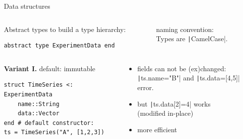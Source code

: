 \documentclass[aspectratio=169, 12pt]{beamer}
\begin{document}
    \begin{frame}[fragile]{Data structures}
        \vspace{-.25\baselineskip}
        \begin{columns}[T]
            \begin{column}{.65\textwidth}
                \alert{Abstract types} to build a type hierarchy:
                \begin{verbatim}
abstract type ExperimentData end
                \end{verbatim}
            \end{column}
            \pause
            \begin{column}{.33\textwidth}
            \alert{naming convention:}\\ Types are
            \texttt|CamelCase|.
            \end{column}
        \end{columns}
        \vspace{\baselineskip}
        \pause
        \begin{columns}[T]
            \begin{column}{.49\textwidth}
                \textbf{Variant I.} default: immutable
                \begin{verbatim}
struct TimeSeries <: ExperimentData
    name::String
    data::Vector
end # default constructor:
ts = TimeSeries("A", [1,2,3])
                \end{verbatim}
            \end{column}
            \begin{column}{.5\textwidth}
                \vspace{-.25\baselineskip}
                \pause
                \begin{itemize}[<+->]
                    \item fields can not be (ex)changed:\\
                    \texttt|ts.name="B"| and
                    \texttt|ts.data=[4,5]| error.\\[.25\baselineskip]
                    \item\alert{but} \texttt|ts.data[2]=4| works
                    \\(modified in-place)
                    \item more efficient

\end{itemize}
\end{column}
\end{columns}
\end{frame}
\end{document}
